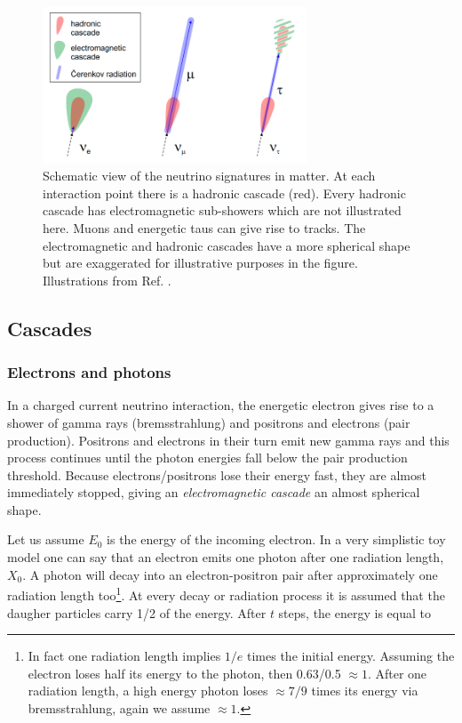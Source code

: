 \begin{figure}[t]
\centering
\includegraphics[width=0.7\textwidth]{chapter4/img/ICinteractions.png}
\caption{Schematic view of the neutrino signatures in matter. At each interaction point there is a hadronic cascade (red). Every hadronic cascade has electromagnetic sub-showers which are not illustrated here. Muons and energetic taus can give rise to tracks. The electromagnetic and hadronic cascades have a more spherical shape but are exaggerated for illustrative purposes in the figure. Illustrations from Ref. \cite{Wallraff}.}
\label{fig:ICinteractions}
\end{figure}

\subsection{Cascades}
\subsubsection{Electrons and photons}

In a charged current neutrino interaction, the energetic electron gives rise to a shower of gamma rays (bremsstrahlung) and positrons and electrons (pair production). Positrons and electrons in their turn emit new gamma rays and this process continues until the photon energies fall below the pair production threshold. Because electrons/positrons lose their energy fast, they are almost immediately stopped, giving an \textit{electromagnetic cascade} an almost spherical shape.

Let us assume $E_0$ is the energy of the incoming electron. In a very simplistic toy model one can say that an electron emits one photon after one radiation length, $X_0$. A photon will decay into an electron-positron pair after approximately one radiation length too\footnote{In fact one radiation length implies $1/e$ times the initial energy. Assuming the electron loses half its energy to the photon, then 0.63/0.5 $\approx 1$. After one radiation length, a high energy photon loses $\approx 7/9$ times its energy via bremsstrahlung, again we assume $\approx 1$.}. At every decay or radiation process it is assumed that the daugher particles carry 1/2 of the energy. After $t$ steps, the energy is equal to

